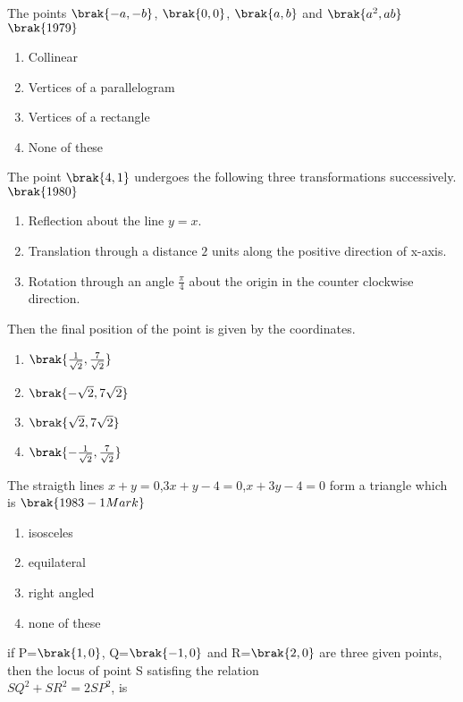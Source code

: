 
\iffalse
\title{straight lines}
\section{mcq-single}
\author{AI24BTECH11018 - Sreya}
\fi
\item The points $\brak{-a,-b}$, $\brak{0,0}$, $\brak{a,b}$ and $\brak{a^2,ab}$\hfill{$\brak{1979}$}
\begin{enumerate}
      \item Collinear
    \item  Vertices of a parallelogram
    \item Vertices of a rectangle
    \item None of these
\end{enumerate}
\item  The point $\brak{4,1}$ undergoes the following three transformations successively.
\hfill{$\brak{1980}$}
\begin{enumerate}
    \item Reflection about the line $y=x$.
    \item Translation through a distance $2$ units along the positive direction of x-axis.
    \item Rotation through an angle $\frac{\pi}{4}$ about the origin in the counter clockwise direction.
\end{enumerate}
Then the final position of the point is given by the coordinates.
\begin{enumerate} 
    \item $\brak{\frac{1}{\sqrt{2}},\frac{7}{\sqrt{2}}}$
    \item $\brak{-\sqrt{2},7\sqrt{2}}$
    \item $\brak{\sqrt{2},7\sqrt{2}}$
    \item $\brak{-\frac{1}{\sqrt{2}},\frac{7}{\sqrt{2}}}$
\end{enumerate}
\item The straigth lines $x+y=0$,$3x+y-4=0$,$x+3y-4=0$ form a triangle which is \hfill{$\brak{1983-1 Mark}$}
\begin{enumerate}   
     \item isosceles
     \item equilateral
     \item right angled
     \item none of these
\end{enumerate}
\item if P=$\brak{1,0}$, Q=$\brak{-1,0}$ and R=$\brak{2,0}$ are three given points, then the locus of point S satisfing the relation\\$SQ^2+SR^2=2SP^2$, is 
